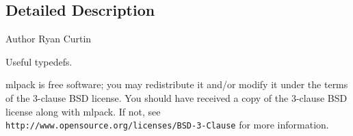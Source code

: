 \subsection{Detailed Description}
\begin{DoxyAuthor}{Author}
Ryan Curtin
\end{DoxyAuthor}
Useful typedefs.

mlpack is free software; you may redistribute it and/or modify it under the terms of the 3-\/clause B\+SD license. You should have received a copy of the 3-\/clause B\+SD license along with mlpack. If not, see {\tt http\+://www.\+opensource.\+org/licenses/\+B\+S\+D-\/3-\/\+Clause} for more information. 